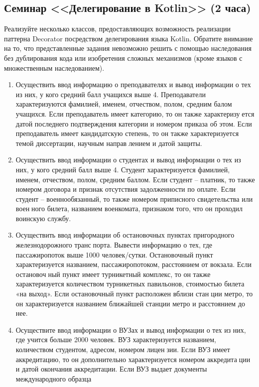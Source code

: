 \subsection{Семинар <<Делегирование в Kotlin>> (2 часа)} 

Реализуйте несколько классов, предоставляющих возможность реализации паттерна Decorator посредством делегирования языка Kotlin. Обратите внимание на то, что представленные задания невозможно решить с помощью наследования без дублирования кода или изобретения сложных механизмов (кроме языков с множественным наследованием).

\begin{enumerate}
\item Осуществить ввод информацию о преподавателях и вывод информации о тех из них, у кого
средний балл учащихся выше 4. Преподаватели характеризуются фамилией, именем, отчеством,
полом, средним балом учащихся. Если преподаватель имеет категорию, то он также характеризуется датой последнего подтверждения категории и номером приказа об этом. Если преподаватель
имеет кандидатскую степень, то он также характеризуется темой диссертации, научным направлением и датой защиты.
\item Осуществить ввод информации о студентах и вывод информации о тех из них, у кого средний
балл выше 4. Студент характеризуется фамилией, именем, отчеством, полом, средним баллом.
Если студент – платник, то также номером договора и признак отсутствия задолженности по
оплате. Если студент – военнообязанный, то также номером приписного свидетельства или военного билета, названием военкомата, признаком того, что он проходил воинскую службу.
\item Осуществить ввод информации об остановочных пунктах пригородного железнодорожного транспорта. Вывести информацию о тех, где пассажиропоток выше 1000 человек/сутки. Остановочный
пункт характеризуется названием, пассажиропотоком, расстоянием от вокзала. Если остановочный пункт имеет турникетный комплекс, то он также характеризуется количеством турникетных
павильонов, стоимостью билета «на выход». Если остановочный пункт расположен вблизи станции метро, то он характеризуется названием ближайшей станции метро и расстоянием до нее.
\item Осуществите ввод информации о ВУЗах и вывод информации о тех из них, где учится больше
2000 человек. ВУЗ характеризуется названием, количеством студентом, адресом, номером лицензии. Если ВУЗ имеет аккредитацию, то он дополнительно характеризуется номером аккредитации и датой окончания аккредитации. Если ВУЗ выдает документы международного образца

\end{enumerate}
